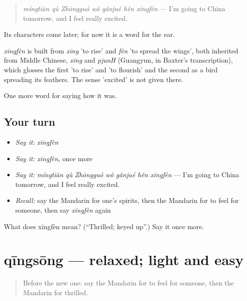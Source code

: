 \begin{quote}
\emph{míngtiān qù Zhōngguó wǒ gǎnjué hěn xīngfèn} — I'm going to China tomorrow, and I feel really excited.
\end{quote}

Its characters come later; for now it is a word for the ear.

\begin{cousinweb}
\emph{xīngfèn} is built from \emph{xīng} 'to rise' and \emph{fèn} 'to spread the wings', both inherited from Middle Chinese, \emph{xing} and \emph{pjunH} (Guangyun, in Baxter's transcription), which glosses the first 'to rise' and 'to flourish' and the second as a bird spreading its feathers. The sense 'excited' is not given there.
\end{cousinweb}

\begin{grammarlens}[title={What you've built}]
One more word for saying how it was.
\end{grammarlens}

\subsection*{Your turn}
\begin{itemize}
\raggedright
  \item \emph{Say it:} \emph{xīngfèn}
  \item \emph{Say it:} \emph{xīngfèn}, once more
  \item \emph{Say it:} \emph{míngtiān qù Zhōngguó wǒ gǎnjué hěn xīngfèn} — I'm going to China tomorrow, and I feel really excited.
  \item \emph{Recall:} say the Mandarin for one's spirits, then the Mandarin for to feel for someone, then say \emph{xīngfèn} again
\end{itemize}

\begin{tcolorbox}[breakable,colback=teal!4,colframe=teal!35!black,title={Before you move on}]
What does xīngfèn mean? (\textquotedblleft{}Thrilled; keyed up\textquotedblright{}.) Say it once more.
\end{tcolorbox}
\section[qīngsōng]{qīngsōng — relaxed; light and easy}

\label{lesson:ZH-C458-qingsong}



\begin{quote}
Before the new one: say the Mandarin for to feel for someone, then the Mandarin for thrilled.
\end{quote}

